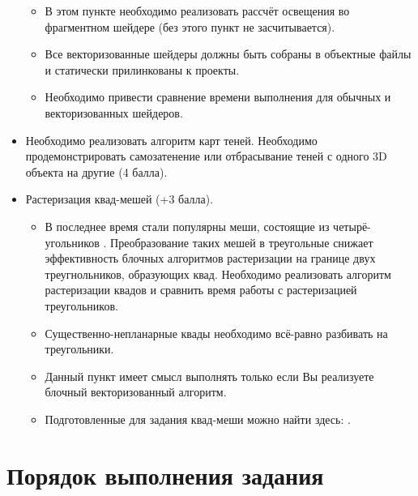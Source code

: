 \documentclass[12pt,subf,href,colorlinks=true]{article}
\begin{document}
\begin{itemize}
    \begin{itemize}
      \item В этом пункте необходимо реализовать рассчёт освещения во фрагментном шейдере (без этого пункт не засчитывается).
      \item Все векторизованные шейдеры должны быть собраны в объектные файлы и статически прилинкованы к проекты.
      \item Необходимо привести сравнение времени выполнения для обычных и векторизованных шейдеров.
    \end{itemize}
	
	\item Необходимо реализовать алгоритм карт теней. Необходимо продемонстрировать самозатенение или отбрасывание теней с одного 3D объекта на другие (4 балла).
	
	\item Растеризация квад-мешей  (+3 балла).
	\begin{itemize}
	  \item В последнее время стали популярны меши, состоящие из четырё-угольников \cite{quadmeshes_about}. Преобразование таких мешей в треугольные снижает эффективность блочных алгоритмов растеризации на границе двух треугнольников, образующих квад. Необходимо реализовать алгоритм растеризации квадов и сравнить время работы с растеризацией треугольников.
	  
	  \item Существенно-непланарные квады необходимо всё-равно разбивать на треугольники.
	  
	  \item Данный пункт имеет смысл выполнять только если Вы реализуете блочный векторизованный алгоритм. 
	  
	  \item Подготовленные для задания квад-меши можно найти здесь: \cite{quadmeshes}. 
	   
	\end{itemize}
	
\end{itemize}

\section{Порядок выполнения задания}
\end{document}

